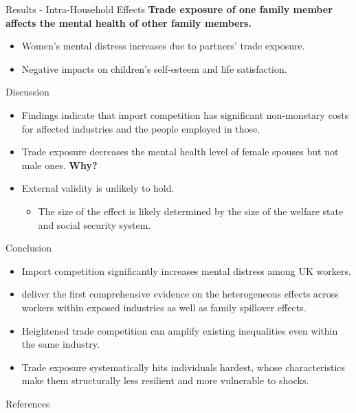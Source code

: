 \documentclass{beamer}
\begin{document}
\begin{frame}{Results - Intra-Household Effects}
     \textbf{Trade exposure of one family member affects the mental health of other family members.}
    \begin{itemize}
        \item Women’s mental distress increases due to partners' trade exposure.
        \item Negative impacts on children’s self-esteem and life satisfaction.
    \end{itemize}
\end{frame}

\begin{frame}{Discussion}
    \begin{itemize}
        \item Findings indicate that import competition has significant non-monetary costs for affected industries and the people employed in those.
        \item Trade exposure decreases the mental health level of female spouses but not male ones. \textbf{Why?} \pause
        \item External validity is unlikely to hold. %
        \begin{itemize}
            \item The size of the effect is likely determined by the size of the welfare state and social security system.
        \end{itemize}
    \end{itemize}
\end{frame}

\begin{frame}{Conclusion}
    \begin{itemize}
        \item Import competition significantly increases mental distress among UK workers.
        \item \textcite{globalization_and_mental_distress} deliver the first comprehensive evidence on the heterogeneous effects across workers within exposed industries as well as family spillover effects.
        \item Heightened trade competition can amplify existing inequalities even within the same industry.
        \item Trade exposure systematically hits individuals hardest, whose characteristics make them structurally less resilient and more vulnerable to shocks.
    \end{itemize}
\end{frame}

\begin{frame}[allowframebreaks]{References}
    \printbibliography
\end{frame}
\end{document}

